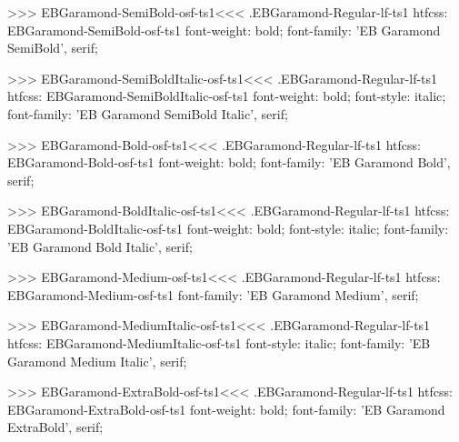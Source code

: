{{{{{{{>>>
\<EBGaramond-SemiBold-osf-ts1\><<<
.EBGaramond-Regular-lf-ts1
htfcss:  EBGaramond-SemiBold-osf-ts1  font-weight: bold; font-family: 'EB Garamond SemiBold', serif;

>>>
\<EBGaramond-SemiBoldItalic-osf-ts1\><<<
.EBGaramond-Regular-lf-ts1
htfcss:  EBGaramond-SemiBoldItalic-osf-ts1  font-weight: bold; font-style: italic; font-family: 'EB Garamond SemiBold Italic', serif;

>>>
\<EBGaramond-Bold-osf-ts1\><<<
.EBGaramond-Regular-lf-ts1
htfcss:  EBGaramond-Bold-osf-ts1  font-weight: bold; font-family: 'EB Garamond Bold', serif;

>>>
\<EBGaramond-BoldItalic-osf-ts1\><<<
.EBGaramond-Regular-lf-ts1
htfcss:  EBGaramond-BoldItalic-osf-ts1  font-weight: bold; font-style: italic; font-family: 'EB Garamond Bold Italic', serif;

>>>
\<EBGaramond-Medium-osf-ts1\><<<
.EBGaramond-Regular-lf-ts1
htfcss:  EBGaramond-Medium-osf-ts1  font-family: 'EB Garamond Medium', serif;

>>>
\<EBGaramond-MediumItalic-osf-ts1\><<<
.EBGaramond-Regular-lf-ts1
htfcss:  EBGaramond-MediumItalic-osf-ts1  font-style: italic; font-family: 'EB Garamond Medium Italic', serif;

>>>
\<EBGaramond-ExtraBold-osf-ts1\><<<
.EBGaramond-Regular-lf-ts1
htfcss:  EBGaramond-ExtraBold-osf-ts1  font-weight: bold; font-family: 'EB Garamond ExtraBold', serif;

}}}}}}}
